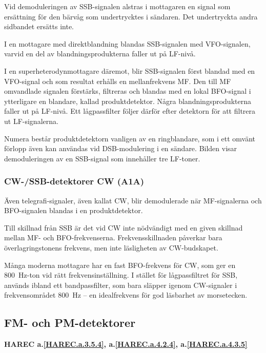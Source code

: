 Vid demoduleringen av SSB-signalen alstras i mottagaren en signal som
ersättning för den bärvåg som undertrycktes i sändaren.
Det undertryckta andra sidbandet ersätts inte.

I en mottagare med direktblandning blandas SSB-signalen med VFO-signalen,
varvid en del av blandningsprodukterna faller ut på LF-nivå.

I en superheterodynmottagare däremot, blir SSB-signalen först blandad
med en VFO-signal och som resultat erhålls en mellanfrekvens MF.
Den till MF omvandlade signalen förstärks, filtreras och blandas med en
lokal BFO-signal i ytterligare en blandare, kallad produktdetektor.
Några blandningsprodukterna faller ut på LF-nivå.
Ett lågpassfilter följer därför efter detektorn för att filtrera ut
LF-signalerna.

Numera består produktdetektorn vanligen av en ringblandare, som i ett omvänt
förlopp även kan användas vid DSB-modulering i en sändare.
Bilden visar demoduleringen av en SSB-signal som innehåller tre LF-toner.

\subsubsection{CW-/SSB-detektorer CW (A1A)}

Även telegrafi-signaler, även kallat CW, blir demodulerade när MF-signalerna
och BFO-signalen blandas i en produktdetektor.

Till skillnad från SSB är det vid CW inte nödvändigt med en given skillnad
mellan MF- och BFO-frekvenserna.
Frekvensskillnaden påverkar bara överlagringstonens frekvens, men inte
läsligheten av CW-budskapet.

Många moderna mottagare har en fast BFO-frekvens för CW, som ger en 800~Hz-ton
vid rätt frekvensinställning.
I stället för lågpassfiltret för SSB, används ibland ett bandpassfilter, som
bara släpper igenom CW-signaler i frekvensområdet 800~Hz -- en idealfrekvens
för god läsbarhet av morsetecken.

\subsection{FM- och PM-detektorer}
\textbf{
HAREC a.\ref{HAREC.a.3.5.4}\label{myHAREC.a.3.5.4},
 a.\ref{HAREC.a.4.2.4}\label{myHAREC.a.4.2.4},
 a.\ref{HAREC.a.4.3.5}\label{myHAREC.a.4.3.5}
}

